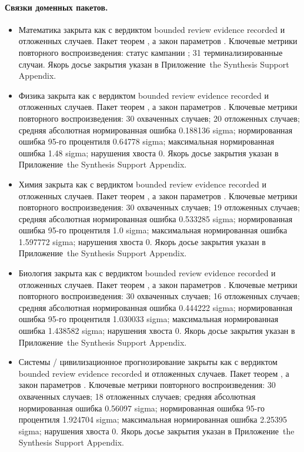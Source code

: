 \paragraph{Связки доменных пакетов.}
\begin{itemize}[leftmargin=1.6em,nosep]
\item Математика закрыта как  с вердиктом bounded review evidence recorded и  отложенных случаев. Пакет теорем , а закон параметров . Ключевые метрики повторного воспроизведения: статус кампании ; 31 терминализированные случаи. Якорь досье закрытия указан в Приложение~the Synthesis Support Appendix.
\item Физика закрыта как  с вердиктом bounded review evidence recorded и  отложенных случаев. Пакет теорем , а закон параметров . Ключевые метрики повторного воспроизведения: 30 охваченных случаев; 20 отложенных случаев; средняя абсолютная нормированная ошибка 0.188136 sigma; нормированная ошибка 95-го процентиля 0.64778 sigma; максимальная нормированная ошибка 1.48 sigma; нарушения хвоста 0. Якорь досье закрытия указан в Приложение~the Synthesis Support Appendix.
\item Химия закрыта как  с вердиктом bounded review evidence recorded и  отложенных случаев. Пакет теорем , а закон параметров . Ключевые метрики повторного воспроизведения: 30 охваченных случаев; 19 отложенных случаев; средняя абсолютная нормированная ошибка 0.533285 sigma; нормированная ошибка 95-го процентиля 1.0 sigma; максимальная нормированная ошибка 1.597772 sigma; нарушения хвоста 0. Якорь досье закрытия указан в Приложение~the Synthesis Support Appendix.
\item Биология закрыта как  с вердиктом bounded review evidence recorded и  отложенных случаев. Пакет теорем , а закон параметров . Ключевые метрики повторного воспроизведения: 30 охваченных случаев; 16 отложенных случаев; средняя абсолютная нормированная ошибка 0.444222 sigma; нормированная ошибка 95-го процентиля 1.030033 sigma; максимальная нормированная ошибка 1.438582 sigma; нарушения хвоста 0. Якорь досье закрытия указан в Приложение~the Synthesis Support Appendix.
\item Системы / цивилизационное прогнозирование закрыты как  с вердиктом bounded review evidence recorded и  отложенных случаев. Пакет теорем , а закон параметров . Ключевые метрики повторного воспроизведения: 30 охваченных случаев; 18 отложенных случаев; средняя абсолютная нормированная ошибка 0.56097 sigma; нормированная ошибка 95-го процентиля 1.924704 sigma; максимальная нормированная ошибка 2.25395 sigma; нарушения хвоста 0. Якорь досье закрытия указан в Приложение~the Synthesis Support Appendix.

\end{itemize}

